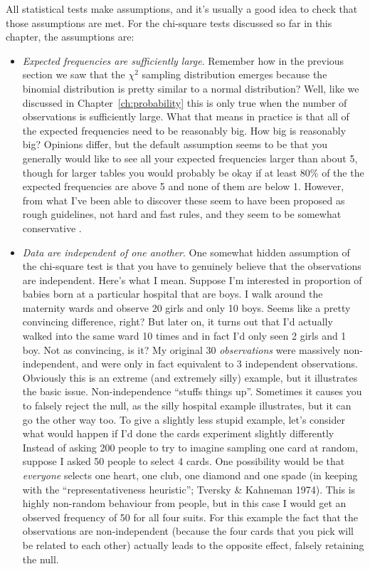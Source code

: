 All statistical tests make assumptions, and it's usually a good idea to check that those assumptions are met. For the chi-square tests discussed so far in this chapter, the assumptions are:

\begin{itemize}
\item {\it Expected frequencies are sufficiently large}. Remember how in the previous section we saw that the $\chi^2$ sampling distribution emerges because the binomial distribution is pretty similar to a normal distribution? Well, like we discussed in Chapter~\ref{ch:probability} this is only true when the number of observations is sufficiently large. What that means in practice is that all of the expected frequencies need to be reasonably big. How big is reasonably big? Opinions differ, but the default assumption seems to be that you generally would like to see all your expected frequencies larger than about 5, though for larger tables you would probably be okay if at least 80\% of the the expected frequencies are above 5 and none of them are below 1. However, from what I've been able to discover \parencite[e.g.,][]{Cochran1954} these seem to have been proposed as rough guidelines, not hard and fast rules, and they seem to be somewhat conservative \parencite{Larntz1978}. 
\item {\it Data are independent of one another}. One somewhat hidden assumption of the chi-square test is that you have to genuinely believe that the observations are independent. Here's what I mean. Suppose I'm interested in proportion of babies born at a particular hospital that are boys. I walk around the maternity wards and observe 20 girls and only 10 boys. Seems like a pretty convincing difference, right? But later on, it turns out that I'd actually walked into the same ward 10 times and in fact I'd only seen 2 girls and 1 boy. Not as convincing, is it? My original 30 {\it observations} were massively non-independent, and were only in fact equivalent to 3 independent observations. Obviously this is an extreme (and extremely silly) example, but it illustrates the basic issue. Non-independence ``stuffs things up''. Sometimes it causes you to falsely reject the null, as the silly hospital example illustrates, but it can go the other way too. To give a slightly less stupid example, let's consider what would happen if I'd done the cards experiment slightly differently Instead of asking 200 people to try to imagine sampling one card at random, suppose I asked 50 people to select 4 cards. One possibility would be that {\it everyone} selects one heart, one club, one diamond and one spade (in keeping with the ``representativeness heuristic''; Tversky \& Kahneman 1974). This is highly non-random behaviour from people, but in this case I would get an observed frequency of 50 for all four suits. For this example the fact that the observations are non-independent (because the four cards that you pick will be related to each other) actually leads to the opposite effect, falsely retaining the null.
\end{itemize}

